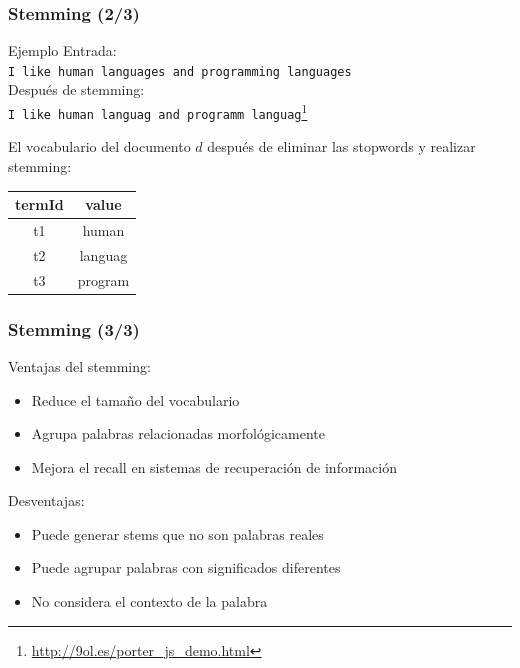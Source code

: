 \documentclass[handout]{beamer}
\begin{document}
\begin{frame}\frametitle{Stemming (2/3)}
\begin{block}{Ejemplo}
    \centering
    \vspace{0.5em}
    Entrada:\\ 
    \texttt{I like human languages and programming languages}\\
    \vspace{0.5em}
    Después de stemming:\\
    \texttt{I like human languag and programm languag}\footnote{\url{http://9ol.es/porter_js_demo.html}}
\end{block}

El vocabulario del documento $d$ después de eliminar las stopwords y realizar stemming:

\begin{table}
\centering
\begin{tabular}{c|c}
\hline
\textbf{termId} & \textbf{value} \\ 
\hline
t1 & human \\ 
t2 & languag \\ 
t3 & program\\ 
\hline
\end{tabular}
\end{table}

\end{frame}

\begin{frame}\frametitle{Stemming (3/3)}

Ventajas del stemming:
\begin{itemize}
\item Reduce el tamaño del vocabulario
\item Agrupa palabras relacionadas morfológicamente
\item Mejora el recall en sistemas de recuperación de información
\end{itemize}

Desventajas:
\begin{itemize}
\item Puede generar stems que no son palabras reales
\item Puede agrupar palabras con significados diferentes
\item No considera el contexto de la palabra
\end{itemize}
\end{frame}
\end{document}
